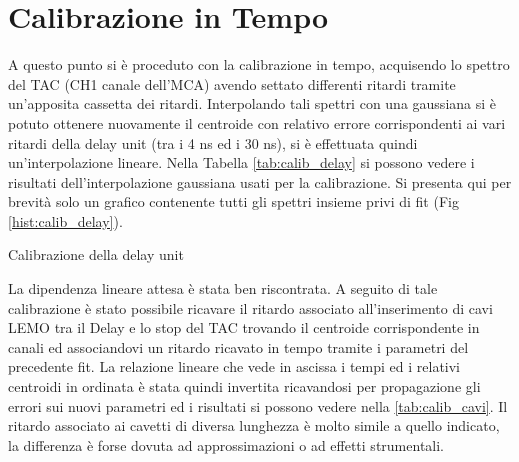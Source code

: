 





\section{Calibrazione in Tempo}

A questo punto si è proceduto con la calibrazione in tempo, acquisendo lo spettro del TAC (CH1 canale dell'MCA) avendo settato differenti ritardi tramite 
un'apposita cassetta dei ritardi. Interpolando tali spettri con una gaussiana si è potuto ottenere nuovamente il centroide con relativo 
errore corrispondenti ai vari ritardi della delay unit (tra i 4 ns ed i 30 ns),
si è effettuata quindi un'interpolazione lineare. Nella Tabella \ref{tab:calib_delay} si possono vedere i risultati dell'interpolazione gaussiana usati per la calibrazione. Si presenta qui per brevità solo un grafico contenente tutti gli spettri insieme privi di fit (Fig \ref{hist:calib_delay}). %


%
\begin{table}[h]
	\centering
	
	\caption{Calibrazione della delay unit}
	\label{tab:calib_delay}
\end{table}
%
%
%	
%

%

La dipendenza lineare attesa è stata ben riscontrata.
A seguito di tale calibrazione è stato possibile ricavare il ritardo associato all'inserimento di cavi LEMO tra il Delay e lo stop del TAC trovando il centroide corrispondente in canali ed associandovi un ritardo ricavato in tempo tramite i parametri del precedente fit. La relazione lineare che vede in ascissa i tempi ed i relativi centroidi in ordinata è stata 
quindi invertita ricavandosi per propagazione gli errori sui nuovi parametri ed i risultati si possono vedere nella \ref{tab:calib_cavi}. Il ritardo associato ai cavetti di diversa lunghezza è molto simile
a quello indicato, la differenza è forse dovuta ad approssimazioni o ad effetti strumentali.\\

